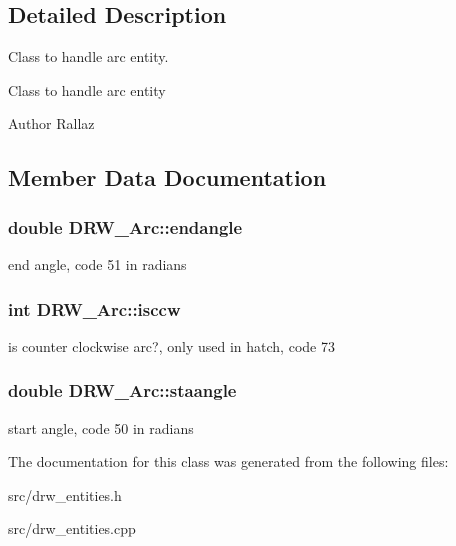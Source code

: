 \subsection{Detailed Description}
Class to handle arc entity. 

Class to handle arc entity \begin{DoxyAuthor}{Author}
Rallaz 
\end{DoxyAuthor}


\subsection{Member Data Documentation}
\hypertarget{class_d_r_w___arc_a3425163b91e875fc7ffad0176e0e8183}{}
\subsubsection[{endangle}]{\setlength{\rightskip}{0pt plus 5cm}double D\+R\+W\+\_\+\+Arc\+::endangle}\label{class_d_r_w___arc_a3425163b91e875fc7ffad0176e0e8183}
end angle, code 51 in radians \hypertarget{class_d_r_w___arc_aaacaac1262bc3e4a2e83c13804d1cb00}{}
\subsubsection[{isccw}]{\setlength{\rightskip}{0pt plus 5cm}int D\+R\+W\+\_\+\+Arc\+::isccw}\label{class_d_r_w___arc_aaacaac1262bc3e4a2e83c13804d1cb00}
is counter clockwise arc?, only used in hatch, code 73 \hypertarget{class_d_r_w___arc_a7718d55eb1ddd3c4038be5798f37570e}{}
\subsubsection[{staangle}]{\setlength{\rightskip}{0pt plus 5cm}double D\+R\+W\+\_\+\+Arc\+::staangle}\label{class_d_r_w___arc_a7718d55eb1ddd3c4038be5798f37570e}
start angle, code 50 in radians 

The documentation for this class was generated from the following files\+:\begin{DoxyCompactItemize}
\item 
src/drw\+\_\+entities.\+h\item 
src/drw\+\_\+entities.\+cpp\end{DoxyCompactItemize}
